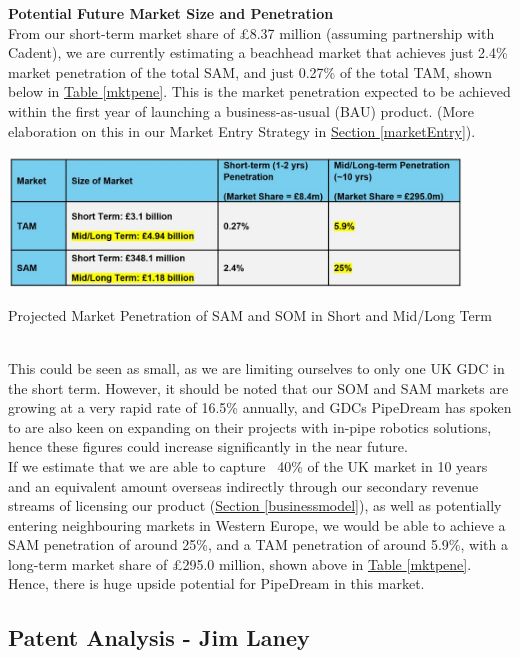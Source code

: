 \documentclass[11pt]{article}		%
\newcommand{\tableref}[1]{\hyperref[#1]{Table \ref*{#1}}}     %
\newcommand{\sectref}[1]{\hyperref[#1]{Section \ref*{#1}}}     %
\begin{document}
    \textbf{Potential Future Market Size and Penetration}
    \\
    From our short-term market share of £8.37 million (assuming partnership with Cadent), we are currently estimating a beachhead market that achieves just 2.4\% market penetration of the total SAM, and just 0.27\% of the total TAM, shown below in \tableref{mktpene}. This is the market penetration expected to be achieved within the first year of launching a business-as-usual (BAU) product. (More elaboration on this in our Market Entry Strategy in \sectref{marketEntry}). 
        \begin{table}[h]
			\centering
			\includegraphics[width=0.9\textwidth]{mktpenetration.jpg}
			\caption{Projected Market Penetration of SAM and SOM in Short and Mid/Long Term}
			\label{mktpene}
 		\end{table}
    \\
    \hspace*{3ex}This could be seen as small, as we are limiting ourselves to only one UK GDC in the short term. However, it should be noted that our SOM and SAM markets are growing at a very rapid rate of 16.5\% annually, and GDCs PipeDream has spoken to are also keen on expanding on their projects with in-pipe robotics solutions, hence these figures could increase significantly in the near future.
    \\
    \hspace*{3ex}If we estimate that we are able to capture ~40\% of the UK market in 10 years and an equivalent amount overseas indirectly through our secondary revenue streams of licensing our product (\sectref{businessmodel}), as well as potentially entering neighbouring markets in Western Europe, we would be able to achieve a SAM penetration of around 25\%, and a TAM penetration of around 5.9\%, with a long-term market share of £295.0 million, shown above in \tableref{mktpene}. Hence, there is huge upside potential for PipeDream in this market. 

	\subsection[Patent Analysis]{Patent Analysis - Jim Laney} \label{patentAnalysis}
        
\end{document}
